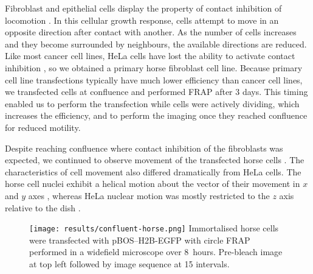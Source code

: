 
    Fibroblast and epithelial cells display the property of contact
    inhibition of locomotion \citep{abercrombie1970contact}.
    In this cellular growth response, cells attempt to move in an
    opposite direction after contact with another.  As the number of
    cells increases and they become surrounded by neighbours, the
    available directions are reduced.
    Like most cancer cell lines, HeLa cells have
    lost the ability to activate contact inhibition
    \citep{stephenson1982locomotory},
    so we obtained a primary horse fibroblast cell line.
    Because primary cell line transfections typically have much lower
    efficiency than cancer cell lines, we transfected cells at
     confluence and performed FRAP after 3 days.
    This timing enabled us to perform the transfection while cells
    were actively dividing, which increases the
    efficiency, and to perform the imaging once they reached confluence for
    reduced motility.

    Despite reaching confluence where contact inhibition
    of the fibroblasts was expected,
    we continued to observe movement of the transfected
    horse cells .
    The characteristics of cell movement also
    differed dramatically from HeLa cells.
    The horse cell nuclei exhibit a helical motion
    about the vector of their movement
    in $x$ and $y$ axes ,
    whereas HeLa nuclear motion was mostly
    restricted to the $z$ axis relative to
    the dish .

    \begin{figure}
      \centering
      \texttt{[image: results/confluent-horse.png]}
        {
          Immortalised horse cells were transfected with pBOS--H2B-EGFP
          with circle FRAP performed in a widefield microscope over 8~hours.
          Pre-bleach image at top left followed by
          image sequence at \SI{15}{\min} intervals.
        }
      \label{fig:kill-frap:confluent-horse}
    \end{figure}

